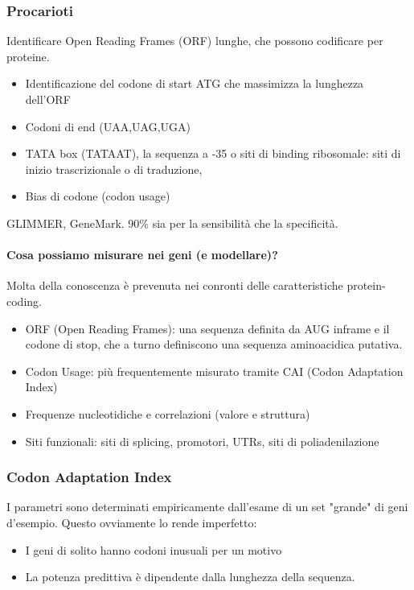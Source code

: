 \documentclass{article}
\begin{document}
\subsubsection{Procarioti}
Identificare Open Reading Frames (ORF) lunghe, che possono codificare per proteine.
\begin{itemize}
    \item Identificazione del codone di start ATG che massimizza la lunghezza dell'ORF
    \item Codoni di end (UAA,UAG,UGA)
    \item TATA box (TATAAT), la sequenza a -35 o siti di binding ribosomale: siti di inizio trascrizionale o di traduzione,
    \item Bias di codone (codon usage)
\end{itemize}
GLIMMER, GeneMark. 90\% sia per la sensibilità che la specificità.
\paragraph{Cosa possiamo misurare nei geni (e modellare)?}
Molta della conoscenza è prevenuta nei conronti delle caratteristiche protein-coding.
\begin{itemize}
    \item ORF (Open Reading Frames): una sequenza definita da AUG inframe e il codone di stop, che a turno definiscono una sequenza aminoacidica putativa.
    \item Codon Usage: più frequentemente misurato tramite CAI (Codon Adaptation Index)
    \item Frequenze nucleotidiche e correlazioni (valore e struttura)
    \item Siti funzionali: siti di splicing, promotori, UTRs, siti di poliadenilazione
\end{itemize}
\subsubsection{Codon Adaptation Index}
I parametri sono determinati empiricamente dall'esame di un set "grande" di geni d'esempio. Questo ovviamente lo rende imperfetto:
\begin{itemize}
    \item I geni di solito hanno codoni inusuali per un motivo 
    \item La potenza predittiva è dipendente dalla lunghezza della sequenza.
\end{itemize}
\end{document}

